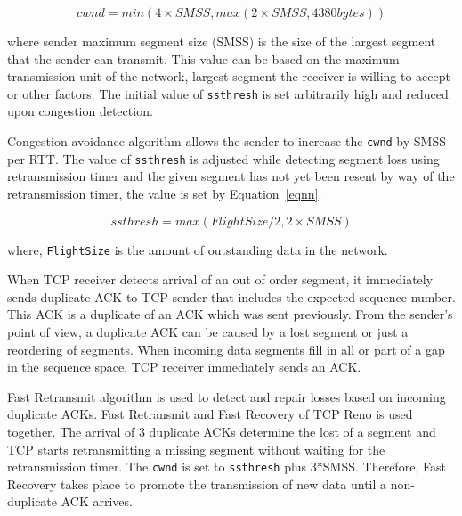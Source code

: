 \documentclass[conference,a4paper]{IEEEtran}
\begin{document}
\begin{equation}
   cwnd = min (4\times SMSS, max (2 \times SMSS, 4380 bytes))
  \label{eqn1}
\end{equation}

where sender maximum segment size (SMSS) is the size of the largest segment that the sender can transmit. This value can be based on the maximum transmission unit of the network, largest segment the receiver is willing to accept or other factors. The initial value of \texttt{ssthresh} is set arbitrarily high and reduced upon congestion detection. 



Congestion avoidance algorithm allows the sender to increase the \texttt{cwnd} by SMSS per RTT. The value of \texttt{ssthresh} is adjusted while detecting segment loss using retransmission timer and the given segment has not yet been resent by way of the retransmission timer, the value is set by Equation~\ref{eqnn}.

\begin{equation}
  ssthresh = max (FlightSize  / 2, 2 \times SMSS)
  \label{eqnn}
\end{equation}

where, \texttt{FlightSize} is the amount of outstanding data in the network. 


When TCP receiver detects arrival of an out of order segment, it immediately sends duplicate ACK to TCP sender that includes the expected sequence number. This ACK is a duplicate of an ACK which was sent previously. From the sender's point of view, a duplicate ACK can be caused by a lost segment or just a reordering of segments. When incoming data segments fill in all or part of a gap in the sequence space, TCP receiver immediately sends an ACK.


Fast Retransmit algorithm is used to detect and repair losses based on incoming duplicate ACKs. Fast Retransmit and Fast Recovery of TCP Reno is used together. The arrival of 3 duplicate ACKs determine the lost of a segment and TCP starts retransmitting a missing segment without waiting for the retransmission timer. The \texttt{cwnd} is set to \texttt{ssthresh} plus 3*SMSS. Therefore, Fast Recovery takes place to promote the transmission of new data until a non-duplicate ACK arrives. 
\end{document}
